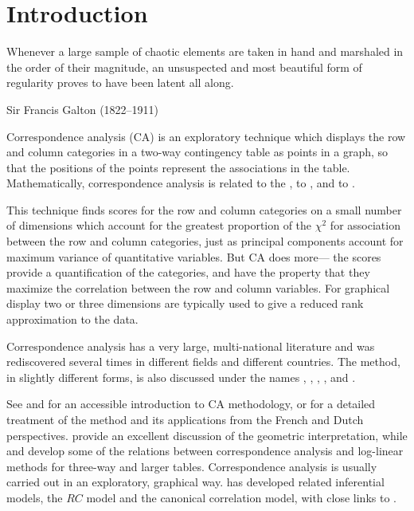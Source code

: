 \documentclass[11pt]{book}
\begin{document}
\section{Introduction}

\epigraph{Whenever a large sample of
chaotic elements
are taken in hand and marshaled in the order of their magnitude, an
unsuspected and most beautiful form of regularity proves to have been
latent all along.}
{Sir Francis Galton (1822--1911)}

Correspondence analysis (CA) is an exploratory technique which displays
the row and column categories in a two-way contingency table as points
in a graph, so that the positions of the points represent the
associations in the table.
Mathematically, correspondence analysis is related to the ,
to ,
and to .

This technique finds
scores for the row and column categories on a small number of
dimensions which account for the greatest proportion of the
\(\chi^2\) for association between the row and column categories,
just as principal components account for maximum variance
of quantitative variables.  But CA does more---
the scores provide a quantification of the categories,
and have the property that they maximize the correlation
between the row and column variables.   For
graphical display two or three dimensions are typically used to give
a reduced rank approximation to the data.

Correspondence analysis has a very large, multi-national literature and
was rediscovered several times in different fields and different countries.   
The method, in slightly different forms, is also
discussed under the names
, ,
,
,
and .

See \citet{Greenacre:84} and \citet{Greenacre:2007}
for an accessible introduction to CA methodology,
or \citet{Gifi:81,Lebart-etal:84}
for a detailed treatment of the method and its applications
from the French and Dutch perspectives. 
\citet{GreenacreHastie:87} provide an excellent discussion of
the geometric interpretation,
while \citet{HeijdenLeeuw:85} and \citet{Heijden-etal:89}
develop some of the relations between correspondence analysis
and log-linear methods for three-way and larger tables.
Correspondence analysis is usually carried out in an exploratory,
graphical way. 
\citet{Goodman:81,Goodman:85,Goodman:86} has developed related inferential models, the $RC$ model and
the canonical correlation model, with close links to \CA.
\end{document}
